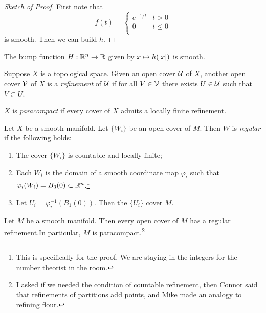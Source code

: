 \documentclass[twoside, 10pt]{article}
\begin{document}
    \begin{proof}[Sketch of Proof]
        First note that \[f(t) = \begin{cases}
            e^{-1/t} & t > 0 \\
            0 & t \leq 0 \\
        \end{cases} \]
        is smooth. Then we can build $h$.
    \end{proof}

    \begin{lem}
        The bump function $H: \mathbb{R}^n \to \mathbb{R}$ given by $x \mapsto h(\lvert x\rvert)$ is smooth.
    \end{lem}

    \begin{defn}
        Suppose $X$ is a topological space. Given an open cover $\mathcal{U}$ of $X$, another open cover $\mathcal{V}$ of $X$ is a \textit{refinement} of $\mathcal{U}$ if for all $V \in \mathcal{V}$ there exists $U \in \mathcal{U}$ such that $V \subset U$.
    \end{defn}

    \begin{defn}
        $X$ is \textit{paracompact} if every cover of $X$ admits a locally finite refinement.
    \end{defn}

    \begin{defn}
        Let $X$ be a smooth manifold. Let $\{W_i\}$ be an open cover of $M$. Then $W$ is \textit{regular} if the following holds:
        \begin{enumerate}
            \item The cover $\{W_i\}$ is countable and locally finite;
            \item Each $W_i$ is the domain of a smooth coordinate map $\varphi_i$ such that $\varphi_i(W_i) = B_3(0) \subset \mathbb{R}^n$.\footnote{This is specifically for the proof. We are staying in the integers for the number theorist in the room.}
            \item Let $U_i = \varphi_i^{-1}(B_1(0))$. Then the $\{U_i\}$ cover $M$.
        \end{enumerate}
    \end{defn}

    \begin{prop}
        Let $M$ be a smooth manifold. Then every open cover of $M$ has a regular refinement.In particular, $M$ is paracompact.\footnote{I asked if we needed the condition of countable refinement, then Connor said that refinements of partitions add points, and Mike made an analogy to refining flour.}
    \end{prop}
\end{document}
